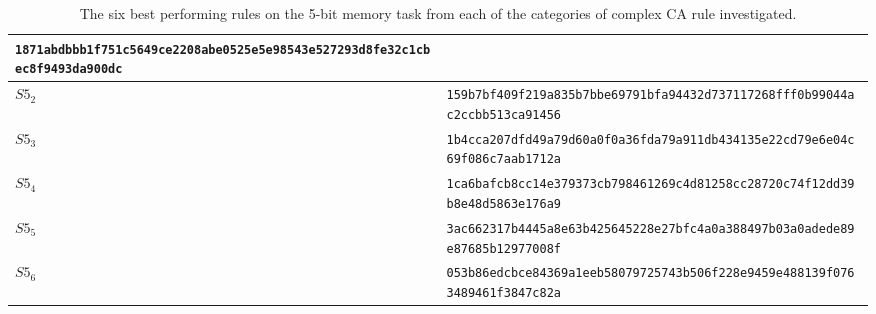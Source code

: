 \documentclass{elsarticle}
\begin{document}
\begin{multicols}{2}
\begin{table}[!htbp]
\begin{tabular}{|p{2cm}|l|}
    \verb|1871abdbbb1f751c5649ce2208abe0525e5e98543e527293d8fe32c1cbec8f9493da900dc| 
    \\
    \hline
    $S5_{2}$ & %
\verb|159b7bf409f219a835b7bbe69791bfa94432d737117268fff0b99044ac2ccbb513ca91456| 
\\
\hline
$S5_{3}$ & %
\verb|1b4cca207dfd49a79d60a0f0a36fda79a911db434135e22cd79e6e04c69f086c7aab1712a|
\\ \hline
$S5_{4}$  & %
\verb|1ca6bafcb8cc14e379373cb798461269c4d81258cc28720c74f12dd39b8e48d5863e176a9|
\\ \hline
$S5_{5}$ & %
\verb|3ac662317b4445a8e63b425645228e27bfc4a0a388497b03a0adede89e87685b12977008f|
\\ \hline
$S5_{6}$ & %
\verb|053b86edcbce84369a1eeb58079725743b506f228e9459e488139f0763489461f3847c82a|
\\ \hline
\end{tabular}
\caption{The six best performing rules on the 5-bit memory task from each of 
   the categories of complex CA rule investigated.}
\label{table:rules}
\end{table}



\end{multicols}
\end{document}

